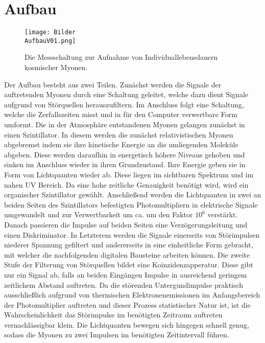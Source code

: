 \section{Aufbau}
\label{sec:Aufbau}
\begin{figure}
    \centering
    \texttt{[image: Bilder\\AufbauV01.png]}
    \caption{Die Messschaltung zur Aufnahme von Individuallebensdauern kosmischer Myonen.}
    \label{fig:Aufbau}
    \end{figure}

    Der Aufbau besteht aus zwei Teilen. Zunächst werden die Signale der auftretenden Myonen durch eine Schaltung geleitet, welche dazu dient Signale aufgrund von Störquellen herauszufiltern. Im Anschluss folgt eine Schaltung, welche die Zerfallszeiten misst und in für den Computer verwertbare Form umformt. Die in der Atmosphäre entstandenen Myonen gelangen zunächst in einen Szintillator. In diesem werden die zunächst relativistischen  Myonen abgebremst indem sie ihre kinetische Energie an die umliegenden Moleküle abgeben. Diese werden daraufhin in energetisch höhere Niveaus gehoben und sinken im Anschluss wieder in ihren Grundzustand. Ihre Energie geben sie in Form von Lichtquanten wieder ab. Diese liegen im sichtbaren Spektrum und im nahen UV Bereich. Da eine hohe zeitliche Genauigkeit benötigt wird, wird ein organischer Szintillator gewählt. Anschließend werden die Lichtquanten in zwei an beiden Seiten des Szintillators befestigten Photomultipliern in elektrische Signale umgewandelt und zur Verwertbarkeit um ca. um den Faktor $10^6$ verstärkt. Danach passieren die Impulse auf beiden Seiten eine Verzögerungsleitung und einen Diskriminator. In Letzterem werden die Signale einerseits von Störimpulsen niederer Spannung gefiltert und andererseits in eine einheitliche Form gebracht, mit welcher die nachfolgenden digitalen Bausteine arbeiten können. Die zweite Stufe der Filterung von Störquellen bildet eine Koinzidenzapperatur. Diese gibt nur ein Signal ab, falls an beiden Eingängen Impulse in ausreichend geringem zeitlichem Abstand auftreten. Da die störenden Untergundimpulse praktisch ausschließlich aufgrund von thermischen Elektronenemissionen im Anfangsbereich der Photomultiplier auftreten und dieser Prozess statistischer Natur ist, ist die Wahrscheinlichkeit das Störimpulse im benötigten Zeitraum auftreten vernachlässigbar klein. Die Lichtquanten bewegen sich hingegen schnell genug, sodass die Myonen zu zwei Impulsen im benötigten Zeitintervall führen.
